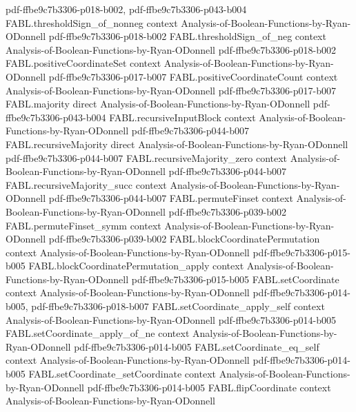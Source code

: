 \begin{theorem}
  {pdf-ffbe9c7b3306-p018-b002,
    pdf-ffbe9c7b3306-p043-b004}
\proofstep
  {FABL.thresholdSign_of_nonneg}
  {context}
  {Analysis-of-Boolean-Functions-by-Ryan-ODonnell}
  {pdf-ffbe9c7b3306-p018-b002}
\proofstep
  {FABL.thresholdSign_of_neg}
  {context}
  {Analysis-of-Boolean-Functions-by-Ryan-ODonnell}
  {pdf-ffbe9c7b3306-p018-b002}
\proofstep
  {FABL.positiveCoordinateSet}
  {context}
  {Analysis-of-Boolean-Functions-by-Ryan-ODonnell}
  {pdf-ffbe9c7b3306-p017-b007}
\proofstep
  {FABL.positiveCoordinateCount}
  {context}
  {Analysis-of-Boolean-Functions-by-Ryan-ODonnell}
  {pdf-ffbe9c7b3306-p017-b007}
\proofstep
  {FABL.majority}
  {direct}
  {Analysis-of-Boolean-Functions-by-Ryan-ODonnell}
  {pdf-ffbe9c7b3306-p043-b004}
\proofstep
  {FABL.recursiveInputBlock}
  {context}
  {Analysis-of-Boolean-Functions-by-Ryan-ODonnell}
  {pdf-ffbe9c7b3306-p044-b007}
\proofstep
  {FABL.recursiveMajority}
  {direct}
  {Analysis-of-Boolean-Functions-by-Ryan-ODonnell}
  {pdf-ffbe9c7b3306-p044-b007}
\proofstep
  {FABL.recursiveMajority_zero}
  {context}
  {Analysis-of-Boolean-Functions-by-Ryan-ODonnell}
  {pdf-ffbe9c7b3306-p044-b007}
\proofstep
  {FABL.recursiveMajority_succ}
  {context}
  {Analysis-of-Boolean-Functions-by-Ryan-ODonnell}
  {pdf-ffbe9c7b3306-p044-b007}
\proofstep
  {FABL.permuteFinset}
  {context}
  {Analysis-of-Boolean-Functions-by-Ryan-ODonnell}
  {pdf-ffbe9c7b3306-p039-b002}
\proofstep
  {FABL.permuteFinset_symm}
  {context}
  {Analysis-of-Boolean-Functions-by-Ryan-ODonnell}
  {pdf-ffbe9c7b3306-p039-b002}
\proofstep
  {FABL.blockCoordinatePermutation}
  {context}
  {Analysis-of-Boolean-Functions-by-Ryan-ODonnell}
  {pdf-ffbe9c7b3306-p015-b005}
\proofstep
  {FABL.blockCoordinatePermutation_apply}
  {context}
  {Analysis-of-Boolean-Functions-by-Ryan-ODonnell}
  {pdf-ffbe9c7b3306-p015-b005}
\proofstep
  {FABL.setCoordinate}
  {context}
  {Analysis-of-Boolean-Functions-by-Ryan-ODonnell}
  {pdf-ffbe9c7b3306-p014-b005,
    pdf-ffbe9c7b3306-p018-b007}
\proofstep
  {FABL.setCoordinate_apply_self}
  {context}
  {Analysis-of-Boolean-Functions-by-Ryan-ODonnell}
  {pdf-ffbe9c7b3306-p014-b005}
\proofstep
  {FABL.setCoordinate_apply_of_ne}
  {context}
  {Analysis-of-Boolean-Functions-by-Ryan-ODonnell}
  {pdf-ffbe9c7b3306-p014-b005}
\proofstep
  {FABL.setCoordinate_eq_self}
  {context}
  {Analysis-of-Boolean-Functions-by-Ryan-ODonnell}
  {pdf-ffbe9c7b3306-p014-b005}
\proofstep
  {FABL.setCoordinate_setCoordinate}
  {context}
  {Analysis-of-Boolean-Functions-by-Ryan-ODonnell}
  {pdf-ffbe9c7b3306-p014-b005}
\proofstep
  {FABL.flipCoordinate}
  {context}
  {Analysis-of-Boolean-Functions-by-Ryan-ODonnell}

\end{theorem}
